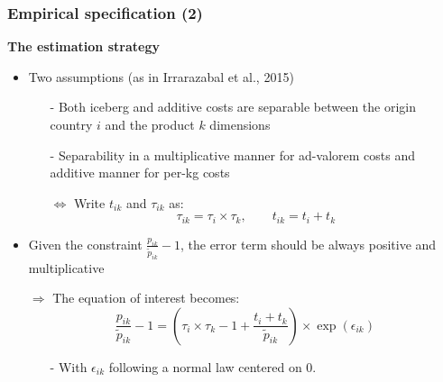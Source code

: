 \documentclass[10 pt,Helvetica, french]{beamer}
\begin{document}
\begin{frame}
\frametitle{Empirical specification (2)}
\textbf{The estimation strategy}
\begin{itemize}
\item Two assumptions (as in Irrarazabal et al., 2015) \vspace{0.1cm}
\begin{itemize}
\item[-] Both iceberg and additive costs are separable between the origin country $i$ and the product $k$ dimensions \vspace{0.1cm}
\item[-] Separability in a multiplicative manner for ad-valorem costs and additive manner for per-kg costs \vspace{0.1cm}
\item[$\Leftrightarrow$] Write $t_{ik}$ and $\tau_{ik}$ as:
\begin{equation}
 \tau_{ik} = \tau_{i} \times \tau_{k}, \qquad t_{ik} = t_{i} + t_{k} \label{eq:specifTC}
 \end{equation}
\end{itemize}
\item Given the constraint $\frac{p_{ik}}{\widetilde{p}_{ik}} -1$, the error term should be always positive and multiplicative \vspace{0.1cm}
\item[$\Rightarrow$] The equation of interest becomes:
\footnotesize
$$\frac{p_{ik}}{\widetilde{p}_{ik}}-1 =\left(\tau_{i} \times \tau_{k} -1+\frac{t_{i} + t_{k}}{\widetilde{p}_{ik}} \right)\times \exp(\epsilon_{ik})$$
\normalsize
\begin{itemize}
\item[-] With $\epsilon_{ik}$ following a normal law centered on 0.
\end{itemize}

\end{itemize}
\end{frame}
\end{document}
